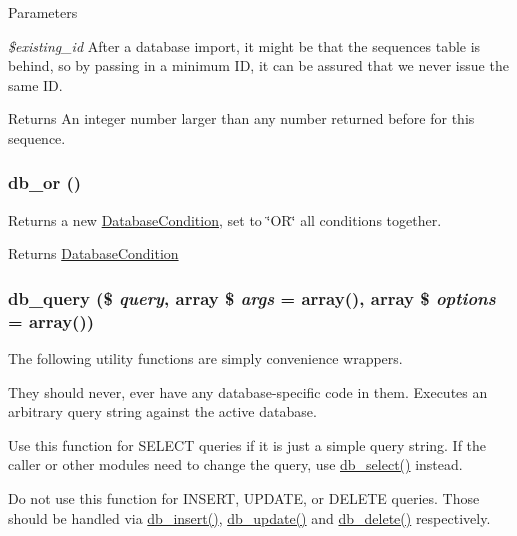 \begin{DoxyParams}{Parameters}
\item[{\em \$existing\_\-id}]After a database import, it might be that the sequences table is behind, so by passing in a minimum ID, it can be assured that we never issue the same ID.\end{DoxyParams}
\begin{DoxyReturn}{Returns}
An integer number larger than any number returned before for this sequence. 
\end{DoxyReturn}
\hypertarget{group__database_ga1a7695a360b8c2219fe1998dfc272080}{
\subsubsection[{db\_\-or}]{\setlength{\rightskip}{0pt plus 5cm}db\_\-or ()}}
\label{group__database_ga1a7695a360b8c2219fe1998dfc272080}
Returns a new \hyperlink{classDatabaseCondition}{DatabaseCondition}, set to \char`\"{}OR\char`\"{} all conditions together.

\begin{DoxyReturn}{Returns}
\hyperlink{classDatabaseCondition}{DatabaseCondition} 
\end{DoxyReturn}
\hypertarget{group__database_gafa3b6cb2b2f61479cc63a4150c62da9b}{
\subsubsection[{db\_\-query}]{\setlength{\rightskip}{0pt plus 5cm}db\_\-query (\$ {\em query}, \/  array \$ {\em args} = {\ttfamily array()}, \/  array \$ {\em options} = {\ttfamily array()})}}
\label{group__database_gafa3b6cb2b2f61479cc63a4150c62da9b}
The following utility functions are simply convenience wrappers.

They should never, ever have any database-\/specific code in them. Executes an arbitrary query string against the active database.

Use this function for SELECT queries if it is just a simple query string. If the caller or other modules need to change the query, use \hyperlink{group__database_ga9e030cee657d64e3d8e524c65814cc9f}{db\_\-select()} instead.

Do not use this function for INSERT, UPDATE, or DELETE queries. Those should be handled via \hyperlink{group__database_gaadfbffaf30ff5eb14f1bd88619351345}{db\_\-insert()}, \hyperlink{group__database_ga40967197ee5d6a23a5c5a77e627067fe}{db\_\-update()} and \hyperlink{group__database_ga72f0ccecc0ba181de16c6e3451150f2c}{db\_\-delete()} respectively.


